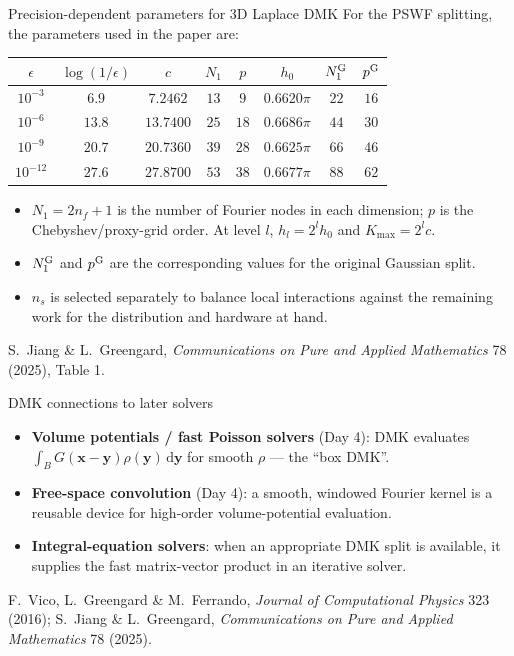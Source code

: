 \documentclass[aspectratio=169,11pt]{beamer}
\newcommand{\dd}{\,\mathrm d}
\newcommand{\x}{\bm{x}}
\newcommand{\y}{\bm{y}}
\newcommand{\hl}[1]{{\color{CCMorange}\textbf{#1}}}
\newcommand{\gray}[1]{{\color{mygray}#1}}
\begin{document}
\begin{frame}{Precision-dependent parameters for 3D Laplace DMK}
\scriptsize
For the PSWF splitting, the parameters used in the paper are:
\begin{center}
\begin{tabular}{@{}cccccccc@{}}
\toprule
\(\epsilon\) & \(\log(1/\epsilon)\) & \(c\) & \(N_1\) & \(p\) & \(h_0\) & \(N_1^{\rm G}\) & \(p^{\rm G}\) \\
\midrule
\(10^{-3}\)  & \(6.9\)  & \(7.2462\)  & \(13\) & \(9\)  & \(0.6620\pi\) & \(22\) & \(16\) \\
\(10^{-6}\)  & \(13.8\) & \(13.7400\) & \(25\) & \(18\) & \(0.6686\pi\) & \(44\) & \(30\) \\
\(10^{-9}\)  & \(20.7\) & \(20.7360\) & \(39\) & \(28\) & \(0.6625\pi\) & \(66\) & \(46\) \\
\(10^{-12}\) & \(27.6\) & \(27.8700\) & \(53\) & \(38\) & \(0.6677\pi\) & \(88\) & \(62\) \\
\bottomrule
\end{tabular}
\end{center}
\begin{itemize}
  \item \(N_1=2n_f+1\) is the number of Fourier nodes in each dimension; \(p\) is the Chebyshev/proxy-grid order. At level \(l\), \(h_l=2^l h_0\) and \(K_{\max}=2^l c\).
  \item \(N_1^{\rm G}\) and \(p^{\rm G}\) are the corresponding values for the original Gaussian split.
  \item \(n_s\) is selected separately to balance local interactions against the remaining work for the distribution and hardware at hand.
\end{itemize}
{\scriptsize\gray{S.\ Jiang \& L.\ Greengard, \emph{Communications on Pure and Applied Mathematics} 78 (2025), Table 1.}}
\end{frame}

\begin{frame}{DMK connections to later solvers}
\small
\begin{itemize}\itemsep3pt
  \item \hl{Volume potentials / fast Poisson solvers} (Day 4): DMK evaluates \(\int_B G(\x-\y)\rho(\y)\dd\y\) for smooth \(\rho\) --- the ``box DMK''.
  \item \hl{Free-space convolution} (Day 4): a smooth, windowed Fourier kernel is a reusable device for high-order volume-potential evaluation.
  \item \hl{Integral-equation solvers}: when an appropriate DMK split is available, it supplies the fast matrix-vector product in an iterative solver.
\end{itemize}
{\scriptsize\gray{F.\ Vico, L.\ Greengard \& M.\ Ferrando, \emph{Journal of Computational Physics} 323 (2016); S.\ Jiang \& L.\ Greengard, \emph{Communications on Pure and Applied Mathematics} 78 (2025).}}
\end{frame}
\end{document}
